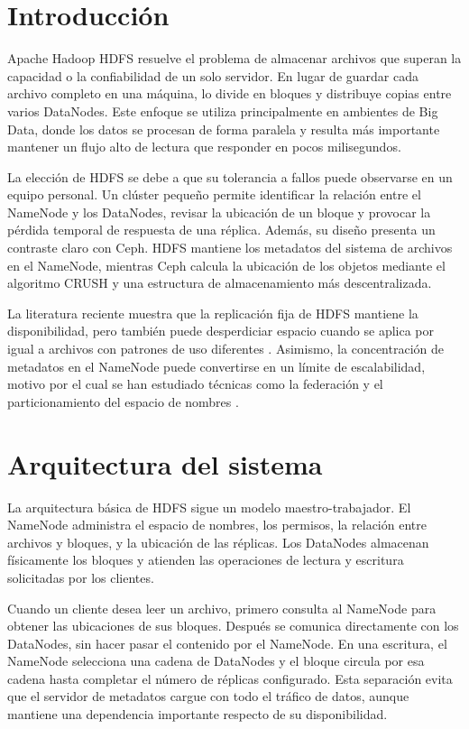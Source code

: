 \documentclass[12pt,a4paper]{article}
\begin{document}
\section{Introducción}

Apache Hadoop HDFS resuelve el problema de almacenar archivos que superan la capacidad o la confiabilidad de un solo servidor. En lugar de guardar cada archivo completo en una máquina, lo divide en bloques y distribuye copias entre varios DataNodes. Este enfoque se utiliza principalmente en ambientes de Big Data, donde los datos se procesan de forma paralela y resulta más importante mantener un flujo alto de lectura que responder en pocos milisegundos.

La elección de HDFS se debe a que su tolerancia a fallos puede observarse en un equipo personal. Un clúster pequeño permite identificar la relación entre el NameNode y los DataNodes, revisar la ubicación de un bloque y provocar la pérdida temporal de respuesta de una réplica. Además, su diseño presenta un contraste claro con Ceph. HDFS mantiene los metadatos del sistema de archivos en el NameNode, mientras Ceph calcula la ubicación de los objetos mediante el algoritmo CRUSH y una estructura de almacenamiento más descentralizada.

La literatura reciente muestra que la replicación fija de HDFS mantiene la disponibilidad, pero también puede desperdiciar espacio cuando se aplica por igual a archivos con patrones de uso diferentes \cite{tlich2025replication}. Asimismo, la concentración de metadatos en el NameNode puede convertirse en un límite de escalabilidad, motivo por el cual se han estudiado técnicas como la federación y el particionamiento del espacio de nombres \cite{dhulavvagol2023federation}.

\section{Arquitectura del sistema}

La arquitectura básica de HDFS sigue un modelo maestro-trabajador. El NameNode administra el espacio de nombres, los permisos, la relación entre archivos y bloques, y la ubicación de las réplicas. Los DataNodes almacenan físicamente los bloques y atienden las operaciones de lectura y escritura solicitadas por los clientes.

Cuando un cliente desea leer un archivo, primero consulta al NameNode para obtener las ubicaciones de sus bloques. Después se comunica directamente con los DataNodes, sin hacer pasar el contenido por el NameNode. En una escritura, el NameNode selecciona una cadena de DataNodes y el bloque circula por esa cadena hasta completar el número de réplicas configurado. Esta separación evita que el servidor de metadatos cargue con todo el tráfico de datos, aunque mantiene una dependencia importante respecto de su disponibilidad.
\end{document}
